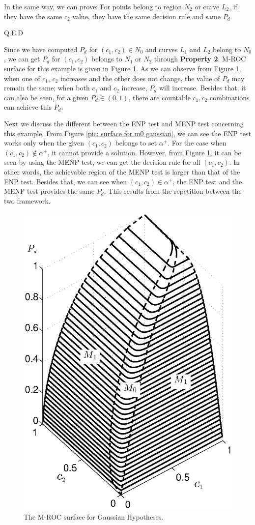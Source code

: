 In the same way, we can prove: For points belong to region $N_2$ or curve $L_2$, if they have the same $c_2$ value, they have the same decision rule and same $P_d$.

Q.E.D

Since we have computed $P_d$ for $(c_1, c_2) \in N_0$ and curves $L_1$ and $L_2$ belong to $N_0$, we can get $P_d$ for $(c_1, c_2)$ belongs to $N_1$ or $N_2$ through \textbf{Property 2}. M-ROC surface for this example is given in Figure  \ref{pic: LJS}.
As we can observe from Figure \ref{pic: LJS}, when one of $c_1$, $c_2$ increases and the other does not change, the value of $P_d$ may remain the same; when both $c_1$ and $c_2$ increase, $P_d$ will increase. Besides that, it can also be seen, for a given $P_d \in (0, 1)$, there are countable $c_1, c_2$ combinations can achieve this $P_d$.   

Next we discuss the different between the ENP test and MENP test concerning this example. 
From Figure \ref{pic: surface for m0 gaussian}, we can see the ENP test works only when the given $(c_1, c_2)$ belongs to set $\alpha^+$. For the case when $(c_1, c_2) \notin \alpha^+$, it cannot provide a solution.  However,  from Figure \ref{pic: LJS}, it can be seen by using the MENP test, we can get the decision rule for all $(c_1, c_2)$. 
In other words, the achievable region of the MENP test is larger than that of the ENP test. 
Besides that, we can see when $(c_1, c_2) \in \alpha^+$, the ENP test and the MENP test provides the same $P_d$. This results from the repetition between the two framework.  
\begin{figure}[!t]
\centering
\includegraphics[width=12cm, height=16cm]{3/ROC2.eps}
\caption{The M-ROC surface for Gaussian Hypotheses.}
\label{pic: LJS}
\end{figure}

